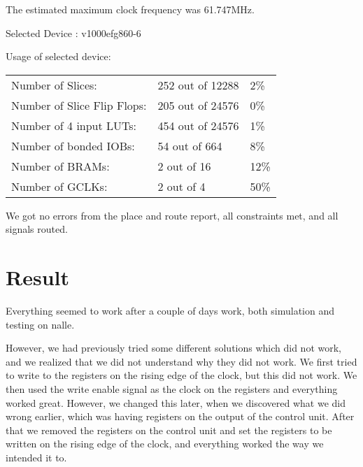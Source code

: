 \documentclass[11pt]{report}
\begin{document}
The estimated maximum clock frequency was 61.747MHz.

Selected Device : v1000efg860-6 

Usage of selected device:
\begin{table}[h]
  \centering
  \begin{tabular}{|l|l|l|} 
    \hline
    Number of Slices:&252 out of 12288&2\% \\ 
    Number of Slice Flip Flops:&205 out of 24576&0\% \\
    Number of 4 input LUTs:&454 out of 24576&1\% \\
    Number of bonded IOBs:&54 out of 664&8\% \\ 
    Number of BRAMs:&2 out of 16&12\% \\  
    Number of GCLKs:&2 out of 4&50\% \\
    \hline
  \end{tabular}
\end{table}


We got no errors from the place and route report, all constraints met,
and all signals routed.

\section*{Result}


Everything seemed to work after a couple of days work, 
both simulation and testing on nalle.

However, we had previously tried some different solutions
which did not work, and we realized that we did not understand why they did 
not work. We first tried to write to the registers on the rising edge of the clock, 
but this did not work. We then used the write enable signal as the clock 
on the registers and everything worked great.
However, we changed this later, when we discovered what we did wrong earlier,
which was having registers on the output of the control unit. After that
we removed the registers on the control unit and set the registers to be
written on the rising edge of the clock, and everything worked the way we
intended it to.
\end{document}
